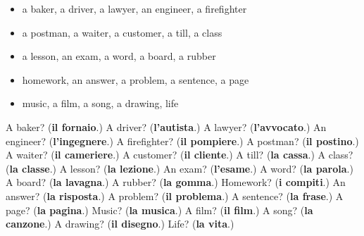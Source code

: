 \begin{itemize}
\raggedright
  \item a baker, a driver, a lawyer, an engineer, a firefighter
  \item a postman, a waiter, a customer, a till, a class
  \item a lesson, an exam, a word, a board, a rubber
  \item homework, an answer, a problem, a sentence, a page
  \item music, a film, a song, a drawing, life
\end{itemize}

\begin{tcolorbox}[breakable,colback=teal!4,colframe=teal!35!black,title={Before you move on}]
A baker? (\textbf{il fornaio}.) A driver? (\textbf{l'autista}.) A lawyer? (\textbf{l'avvocato}.) An engineer? (\textbf{l'ingegnere}.) A firefighter? (\textbf{il pompiere}.) A postman? (\textbf{il postino}.) A waiter? (\textbf{il cameriere}.) A customer? (\textbf{il cliente}.) A till? (\textbf{la cassa}.) A class? (\textbf{la classe}.) A lesson? (\textbf{la lezione}.) An exam? (\textbf{l'esame}.) A word? (\textbf{la parola}.) A board? (\textbf{la lavagna}.) A rubber? (\textbf{la gomma}.) Homework? (\textbf{i compiti}.) An answer? (\textbf{la risposta}.) A problem? (\textbf{il problema}.) A sentence? (\textbf{la frase}.) A page? (\textbf{la pagina}.) Music? (\textbf{la musica}.) A film? (\textbf{il film}.) A song? (\textbf{la canzone}.) A drawing? (\textbf{il disegno}.) Life? (\textbf{la vita}.)
\end{tcolorbox}
